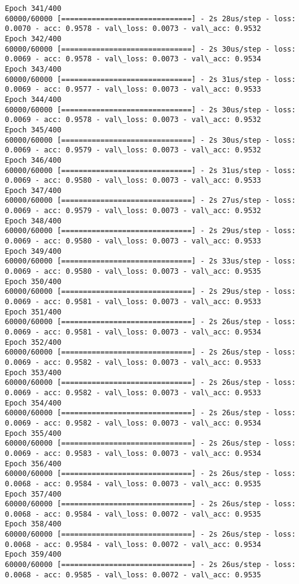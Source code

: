\documentclass[11pt]{article}
\begin{document}
\begin{Verbatim}[commandchars=\\\{\}]
Epoch 341/400
60000/60000 [==============================] - 2s 28us/step - loss: 0.0070 - acc: 0.9578 - val\_loss: 0.0073 - val\_acc: 0.9532
Epoch 342/400
60000/60000 [==============================] - 2s 30us/step - loss: 0.0069 - acc: 0.9578 - val\_loss: 0.0073 - val\_acc: 0.9534
Epoch 343/400
60000/60000 [==============================] - 2s 31us/step - loss: 0.0069 - acc: 0.9577 - val\_loss: 0.0073 - val\_acc: 0.9533
Epoch 344/400
60000/60000 [==============================] - 2s 30us/step - loss: 0.0069 - acc: 0.9578 - val\_loss: 0.0073 - val\_acc: 0.9532
Epoch 345/400
60000/60000 [==============================] - 2s 30us/step - loss: 0.0069 - acc: 0.9579 - val\_loss: 0.0073 - val\_acc: 0.9532
Epoch 346/400
60000/60000 [==============================] - 2s 31us/step - loss: 0.0069 - acc: 0.9580 - val\_loss: 0.0073 - val\_acc: 0.9533
Epoch 347/400
60000/60000 [==============================] - 2s 27us/step - loss: 0.0069 - acc: 0.9579 - val\_loss: 0.0073 - val\_acc: 0.9532
Epoch 348/400
60000/60000 [==============================] - 2s 29us/step - loss: 0.0069 - acc: 0.9580 - val\_loss: 0.0073 - val\_acc: 0.9533
Epoch 349/400
60000/60000 [==============================] - 2s 33us/step - loss: 0.0069 - acc: 0.9580 - val\_loss: 0.0073 - val\_acc: 0.9535
Epoch 350/400
60000/60000 [==============================] - 2s 29us/step - loss: 0.0069 - acc: 0.9581 - val\_loss: 0.0073 - val\_acc: 0.9533
Epoch 351/400
60000/60000 [==============================] - 2s 26us/step - loss: 0.0069 - acc: 0.9581 - val\_loss: 0.0073 - val\_acc: 0.9534
Epoch 352/400
60000/60000 [==============================] - 2s 26us/step - loss: 0.0069 - acc: 0.9582 - val\_loss: 0.0073 - val\_acc: 0.9533
Epoch 353/400
60000/60000 [==============================] - 2s 26us/step - loss: 0.0069 - acc: 0.9582 - val\_loss: 0.0073 - val\_acc: 0.9533
Epoch 354/400
60000/60000 [==============================] - 2s 26us/step - loss: 0.0069 - acc: 0.9582 - val\_loss: 0.0073 - val\_acc: 0.9534
Epoch 355/400
60000/60000 [==============================] - 2s 26us/step - loss: 0.0069 - acc: 0.9583 - val\_loss: 0.0073 - val\_acc: 0.9534
Epoch 356/400
60000/60000 [==============================] - 2s 26us/step - loss: 0.0068 - acc: 0.9584 - val\_loss: 0.0073 - val\_acc: 0.9535
Epoch 357/400
60000/60000 [==============================] - 2s 26us/step - loss: 0.0068 - acc: 0.9584 - val\_loss: 0.0072 - val\_acc: 0.9535
Epoch 358/400
60000/60000 [==============================] - 2s 26us/step - loss: 0.0068 - acc: 0.9584 - val\_loss: 0.0072 - val\_acc: 0.9534
Epoch 359/400
60000/60000 [==============================] - 2s 26us/step - loss: 0.0068 - acc: 0.9585 - val\_loss: 0.0072 - val\_acc: 0.9535

\end{Verbatim}
\end{document}

